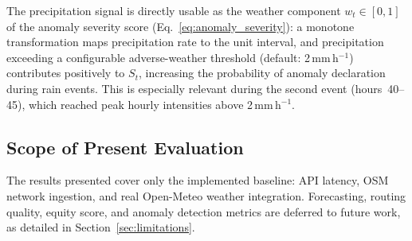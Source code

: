 The precipitation signal is directly usable as the weather component
$w_t \in [0,1]$ of the anomaly severity score
(Eq.~\ref{eq:anomaly_severity}): a monotone transformation maps
precipitation rate to the unit interval, and precipitation exceeding a
configurable adverse-weather threshold (default: 2\,mm\,h$^{-1}$)
contributes positively to $S_t$, increasing the probability of anomaly
declaration during rain events.
This is especially relevant during the second event (hours~40--45),
which reached peak hourly intensities above 2\,mm\,h$^{-1}$.

\subsection{Scope of Present Evaluation}

The results presented cover only the implemented baseline: API latency,
OSM network ingestion, and real Open-Meteo weather integration.
Forecasting, routing quality, equity score, and anomaly detection
metrics are deferred to future work, as detailed in
Section~\ref{sec:limitations}.
